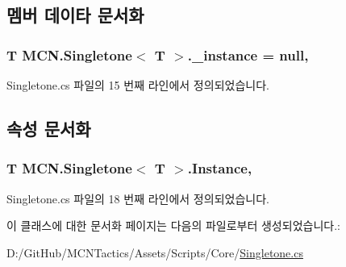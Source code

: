 \subsection{멤버 데이타 문서화}
\subsubsection[{\texorpdfstring{\+\_\+instance}{_instance}}]{\setlength{\rightskip}{0pt plus 5cm}T {\bf M\+C\+N.\+Singletone}$<$ T $>$.\+\_\+instance = null\hspace{0.3cm}{\ttfamily [static]}, {\ttfamily [protected]}}\hypertarget{class_m_c_n_1_1_singletone_a267e8a9e6e7c073b988cda4f95e26eb1}{}\label{class_m_c_n_1_1_singletone_a267e8a9e6e7c073b988cda4f95e26eb1}


Singletone.\+cs 파일의 15 번째 라인에서 정의되었습니다.



\subsection{속성 문서화}
\subsubsection[{\texorpdfstring{Instance}{Instance}}]{\setlength{\rightskip}{0pt plus 5cm}T {\bf M\+C\+N.\+Singletone}$<$ T $>$.Instance\hspace{0.3cm}{\ttfamily [static]}, {\ttfamily [get]}}\hypertarget{class_m_c_n_1_1_singletone_a46dbbebd93e96a9592a9803c51f35602}{}\label{class_m_c_n_1_1_singletone_a46dbbebd93e96a9592a9803c51f35602}


Singletone.\+cs 파일의 18 번째 라인에서 정의되었습니다.



이 클래스에 대한 문서화 페이지는 다음의 파일로부터 생성되었습니다.\+:\begin{DoxyCompactItemize}
\item 
D\+:/\+Git\+Hub/\+M\+C\+N\+Tactics/\+Assets/\+Scripts/\+Core/\hyperlink{_singletone_8cs}{Singletone.\+cs}\end{DoxyCompactItemize}
